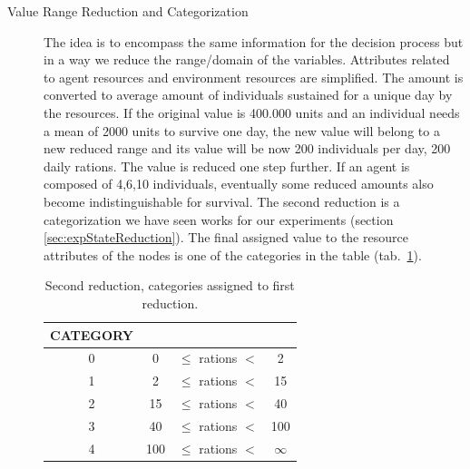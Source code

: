 \documentclass[11pt,oneside,a4paper,openright]{report}
\begin{document}
\begin{description}
\renewcommand{\labelitemi}{$\bullet$}
\renewcommand{\labelitemii}{$\cdot$}
\item [Value Range Reduction and Categorization] 
The idea is to encompass the same information for the decision process but in a way we reduce the range/domain of the variables. Attributes related to agent resources and environment resources are simplified.
The amount is converted to average amount of individuals sustained for a unique day by the resources. If the
original value is 400.000 units and an individual needs a mean of 2000 units to survive one day, the new value
will belong to a new reduced range and its value will be now 200 individuals per day, 200 daily rations. 
The value is reduced one step further. If an agent is composed of 4,6,10 individuals, eventually some reduced
amounts also become indistinguishable for survival. The second reduction is a categorization we have seen works for our experiments (section \ref{sec:expStateReduction}). The final assigned value to the resource attributes of the nodes is one of the categories in the table (tab.~\ref{tab:secondReductionToCategories}).

	\begin{table}[ht!]
	\centering
	\begin{tabular}{|c|c c c|}
		\hline
		CATEGORY&   &                    & \\
		\hline
		0	& 0 & $\leqslant$ rations $<$ & 2 \\
		\hline 
		1	& 2 & $\leqslant$ rations $<$ & 15 \\
		\hline
		2	& 15 & $\leqslant$ rations $<$ & 40 \\
		\hline
		3	& 40 & $\leqslant$ rations $<$ & 100 \\
		\hline
		4	& 100 & $\leqslant$ rations $<$ & $\infty$ \\
		\hline
		
	\end{tabular}
	\caption{Second reduction, categories assigned to first reduction.}
	\label{tab:secondReductionToCategories}
	\end{table}


\end{description}
\end{document}
